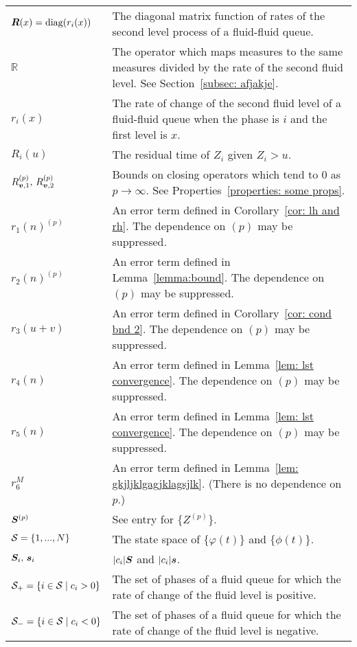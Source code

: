 \begin{longtable}{p{}p{}}
  \(\boldsymbol R(x)=\mathrm{diag}(r_i(x))\)
      & The diagonal matrix function of rates of the second level process of a fluid-fluid queue. \\
  \(\mathbb R\) 
      & The operator which maps measures to the same measures divided by the rate of the second fluid level. See Section~\ref{subsec: afjakje}. \\
  \(r_i(x)\) 
      & The rate of change of the second fluid level of a fluid-fluid queue when the phase is \(i\) and the first level is \(x\). \\
  \(R_i(u)\) 
      & The residual time of \(Z_i\) given \(Z_i>u\). \\ 
  \( R_{\boldsymbol v,1}^{(p)}, \, R_{\boldsymbol v,2}^{(p)}\) 
      & Bounds on closing operators which tend to \(0\) as \(p\to \infty\). See Properties~\ref{properties: some props}. \\
  \(r_1(n)^{(p)}\) 
      & An error term defined in Corollary~\ref{cor: lh and rh}. The dependence on \((p)\) may be suppressed. \\
  \(r_2(n)^{(p)}\) 
      & An error term defined in Lemma~\ref{lemma:bound}. The dependence on \((p)\) may be suppressed. \\
  \(r_3(u+v)\) 
      & An error term defined in Corollary~\ref{cor: cond bnd 2}. The dependence on \((p)\) may be suppressed. \\ 
  \(r_4(n)\) 
      & An error term defined in Lemma~\ref{lem: lst convergence}. The dependence on \((p)\) may be suppressed. \\ 
  \(r_5(n)\) 
      & An error term defined in Lemma~\ref{lem: lst convergence}. The dependence on \((p)\) may be suppressed. \\ 
  \(r_6^M\) 
      & An error term defined in Lemma~\ref{lem: gkjljklgagjklagsjlk}. (There is no dependence on \(p\).) \\ 
  \(\boldsymbol S^{(p)}\) 
      & See entry for \(\{Z^{(p)}\}\). \\
  \(\mathcal{S}=\{1,...,N\}\) 
      & The state space of \(\{\varphi(t)\}\) and \(\{\phi(t)\}\). \\
  \(\boldsymbol S_i,\, \boldsymbol s_i\) 
      & \(|c_i|\boldsymbol S\) and \(|c_i|\boldsymbol s\). \\ 
  \(\mathcal{S}_+=\{i\in\mathcal{S} \mid c_i>0\}\) 
      & The set of phases of a fluid queue for which the rate of change of the fluid level is positive. \\
  \(\mathcal{S}_-=\{i\in\mathcal{S} \mid c_i<0\}\) 
      & The set of phases of a fluid queue for which the rate of change of the fluid level is negative. \\

\end{longtable}
